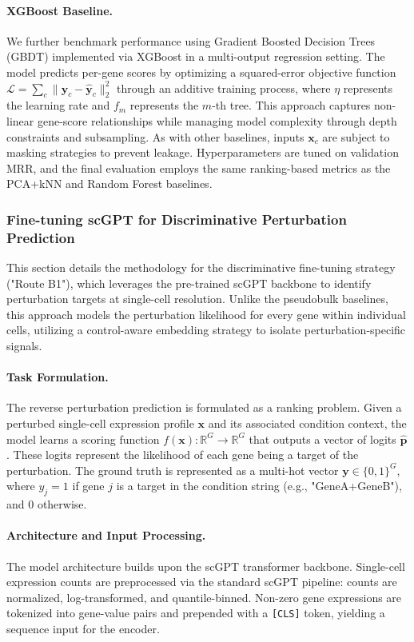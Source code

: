 \documentclass{article}
\begin{document}
\paragraph{XGBoost Baseline.}
We further benchmark performance using Gradient Boosted Decision Trees (GBDT) implemented via XGBoost in a multi-output regression setting. The model predicts per-gene scores by optimizing a squared-error objective function $\mathcal{L} = \sum_c \|\mathbf{y}_c - \hat{\mathbf{y}}_c\|_2^2$ through an additive training process, where $\eta$ represents the learning rate and $f_m$ represents the $m$-th tree. This approach captures non-linear gene-score relationships while managing model complexity through depth constraints and subsampling. As with other baselines, inputs $\mathbf{x}_c$ are subject to masking strategies to prevent leakage. Hyperparameters are tuned on validation MRR, and the final evaluation employs the same ranking-based metrics as the PCA+kNN and Random Forest baselines.

\subsubsection{Fine-tuning scGPT for Discriminative Perturbation Prediction}

This section details the methodology for the discriminative fine-tuning strategy ("Route B1"), which leverages the pre-trained scGPT backbone to identify perturbation targets at single-cell resolution. Unlike the pseudobulk baselines, this approach models the perturbation likelihood for every gene within individual cells, utilizing a control-aware embedding strategy to isolate perturbation-specific signals.

\paragraph{Task Formulation.}
The reverse perturbation prediction is formulated as a ranking problem. Given a perturbed single-cell expression profile $\mathbf{x}$ and its associated condition context, the model learns a scoring function $f(\mathbf{x}): \mathbb{R}^G \rightarrow \mathbb{R}^G$ that outputs a vector of logits $\hat{\mathbf{p}}$. These logits represent the likelihood of each gene being a target of the perturbation.
The ground truth is represented as a multi-hot vector $\mathbf{y} \in \{0,1\}^G$, where $y_j = 1$ if gene $j$ is a target in the condition string (e.g., "GeneA+GeneB"), and 0 otherwise.

\paragraph{Architecture and Input Processing.}
The model architecture builds upon the scGPT transformer backbone. Single-cell expression counts are preprocessed via the standard scGPT pipeline: counts are normalized, log-transformed, and quantile-binned. Non-zero gene expressions are tokenized into gene-value pairs and prepended with a \texttt{[CLS]} token, yielding a sequence input for the encoder.
\end{document}

